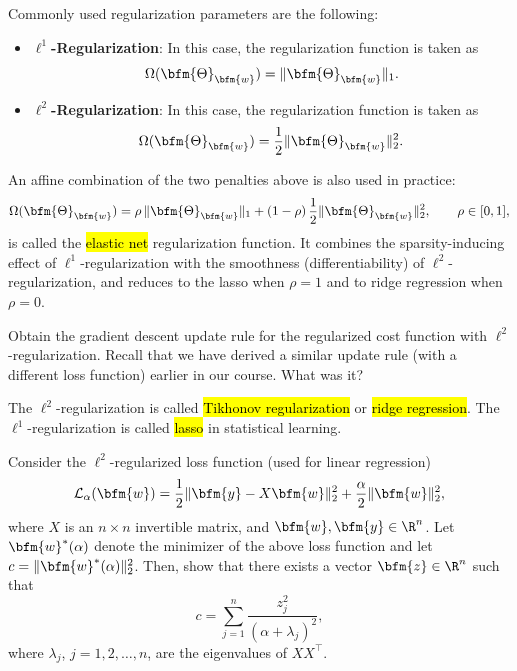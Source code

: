 Commonly used regularization parameters are the following:
\begin{itemize}
\item \textbf{$\ell^1$-Regularization}: In this case, the regularization function is taken as
$$
\Omega(\bfm{\Theta}_{\bfm{w}}) = \|\bfm{\Theta}_{\bfm{w}}\|_1.
$$
\item \textbf{$\ell^2$-Regularization}: In this case, the regularization function is taken as
$$
\Omega(\bfm{\Theta}_{\bfm{w}}) = \frac{1}{2}\|\bfm{\Theta}_{\bfm{w}}\|^2_2.
$$
\end{itemize}
An affine combination of the two penalties above is also used in practice:
$$
\Omega(\bfm{\Theta}_{\bfm{w}}) = \rho\, \|\bfm{\Theta}_{\bfm{w}}\|_1 + (1-\rho)\, \frac{1}{2}\|\bfm{\Theta}_{\bfm{w}}\|^2_2, \qquad \rho\in[0,1],
$$
is called the \hl{elastic net} regularization function. It combines the sparsity-inducing effect of $\ell^1$-regularization with the smoothness (differentiability) of $\ell^2$-regularization, and reduces to the lasso when $\rho=1$ and to ridge regression when $\rho=0$.
\begin{problem}
Obtain the gradient descent update rule for the regularized cost function with $\ell^2$-regularization.  Recall that we have derived a similar update rule (with a different loss function) earlier in our course. What was it?
\end{problem}
\begin{note}
The $\ell^2$-regularization is called \hl{Tikhonov regularization} or \hl{ridge regression}. The $\ell^1$-regularization is called \hl{lasso} in statistical learning.
\end{note}
\begin{problem}\label{alpha.dependency.of.c.prob}
Consider the $\ell^2$-regularized loss function (used for linear regression)
$$
\mathcal{L}_\alpha(\bfm{w}) = \frac{1}{2}\|\bfm{y} - X\bfm{w}\|_{2}^2 + \frac{\alpha}{2} \| \bfm{w} \|^{2}_{2},
$$
where $X$ is an $n\times n$ invertible matrix, and $\bfm{w},\bfm{y}\in \R^n$. Let $\bfm{w}^*(\alpha)$ denote the minimizer of the above loss function and let $c=\|\bfm{w}^*(\alpha)\|^{2}_2$. Then, show that there exists a vector $\bfm{z}\in \R^n$ such that
$$
c = \sum_{j=1}^n \frac{z_{j}^2}{(\alpha + \lambda_j)^2},
$$
where $\lambda_j$, $j=1,2,\ldots, n$, are the eigenvalues of $X X^\top$.
\end{problem}

